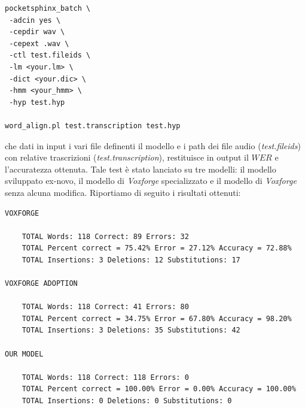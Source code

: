 \documentclass[12pt]{article}
\begin{document}
 \begin{lstlisting}
pocketsphinx_batch \
 -adcin yes \
 -cepdir wav \
 -cepext .wav \
 -ctl test.fileids \
 -lm <your.lm> \
 -dict <your.dic> \
 -hmm <your_hmm> \
 -hyp test.hyp

word_align.pl test.transcription test.hyp
  \end{lstlisting}
che dati in input i vari file definenti il modello e i path dei file audio (\textit{test.fileids}) con relative trascrizioni (\textit{test.transcription}), restituisce in output il $WER$ e l'accuratezza ottenuta. 
Tale test è stato lanciato su tre modelli: il modello sviluppato ex-novo, il modello di \textit{Voxforge} specializzato e il modello di \textit{Voxforge} senza alcuna modifica.
Riportiamo di seguito i risultati ottenuti:

\begin{lstlisting}
VOXFORGE
	
	TOTAL Words: 118 Correct: 89 Errors: 32
	TOTAL Percent correct = 75.42% Error = 27.12% Accuracy = 72.88%
	TOTAL Insertions: 3 Deletions: 12 Substitutions: 17

VOXFORGE ADOPTION

	TOTAL Words: 118 Correct: 41 Errors: 80
	TOTAL Percent correct = 34.75% Error = 67.80% Accuracy = 98.20%
	TOTAL Insertions: 3 Deletions: 35 Substitutions: 42

OUR MODEL

	TOTAL Words: 118 Correct: 118 Errors: 0
	TOTAL Percent correct = 100.00% Error = 0.00% Accuracy = 100.00%
	TOTAL Insertions: 0 Deletions: 0 Substitutions: 0
\end{lstlisting}
\end{document}
